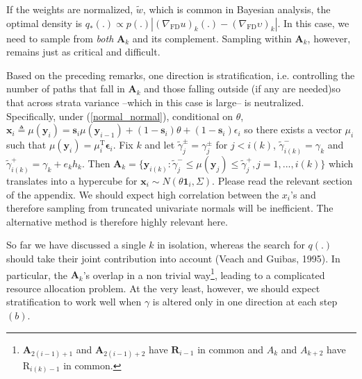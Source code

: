 \documentclass[11pt]{article}
\begin{document}
If the weights are normalized, $\tilde w$, which is common in
Bayesian analysis, the optimal density is $q_*(.)\propto p(.)
|(\nabla_{\mathrm{\scriptscriptstyle FD}}
u)_k(.)-(\nabla_{\mathrm{\scriptscriptstyle FD}} \upsilon)_k|$. In
this case, we need to sample from \emph{both} $\mathbf{A}_k$ and its
complement. Sampling within $\mathbf{A}_k$, however, remains just as
critical and difficult.

Based on the preceding remarks, one direction is stratification,
i.e. controlling the number of paths that fall in $\mathbf{A}_k$ and
those falling outside (if any are needed)so that across strata
variance --which in this case is large-- is neutralized.
Specifically, under (\ref{normal_normal}), conditional on $\theta$,
$\mathbf{x}_i\triangleq\mu(\mathbf{y}_{i})=\mathbf{s}_{i}\mu(\mathbf{y}_{i-1})+(1-\mathbf{s}_{i})\theta+(1-\mathbf{s}_{i})\epsilon_i$
so there exists a vector $\mu_i$ such that
$\mu(\mathbf{y}_{i})=\mu_i^{\mathrm{T}}\mathbf{\epsilon}_i$. Fix $k$
and let $\tilde\gamma_{j}^{\pm}=\gamma_{j}^{\pm}$ for  $j<i(k)$,
$\tilde\gamma_{i(k)}^{-}=\gamma_k$ and
$\tilde\gamma_{i(k)}^{+}=\gamma_k+e_k h_k$. Then
$\mathbf{A}_k=\{\mathbf{y}_{i(k)}:
\tilde\gamma_{j}^{-}\leq\mu(\mathbf{y}_j)\leq\tilde\gamma_{j}^{+},
j=1,...,i(k)\}$ which translates into a hypercube for
$\mathbf{x}_i\sim N(\theta\boldsymbol{1}_i ,\Sigma)$. Please read
the relevant section of the appendix. We should expect high
correlation between the $x_i$'s and therefore sampling from
truncated univariate normals will be inefficient. The alternative
method is therefore highly relevant here.

So far we have discussed a single $k$ in isolation, whereas the
search for $q(.)$ should take their joint contribution into account
(Veach and Guibas, 1995). In particular, the $\mathbf{A}_k$'s
overlap in a non trivial way\footnote{$\mathbf{A}_{2(i-1)+1}$ and
$\mathbf{A}_{2(i-1)+2}$ have $\mathbf{R}_{i-1}$ in common and
$A_{k}$ and $A_{k+2}$ have $\mathrm{R}_{i(k)-1}$ in common.},
leading to a complicated resource allocation problem. At the very
least, however, we should expect stratification to work well when
$\gamma$ is altered only in one direction at each step $(b)$.
\end{document}
